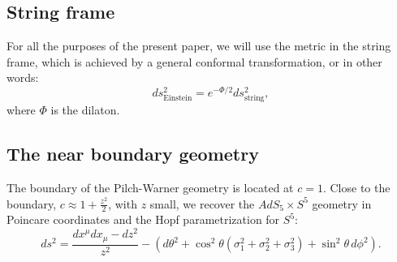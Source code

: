 \subsection{String frame}

For all the purposes of the present paper, we will use the metric in the string frame, which is achieved by a general conformal transformation, or in other words:
\begin{equation}
 ds^2_\text{Einstein} = e^{-\Phi / 2} ds^2_\text{string},
\end{equation}
where $\Phi$ is the dilaton.


\subsection{The near boundary geometry}

The boundary of the Pilch-Warner geometry is located at $c = 1$. 
Close to the boundary, $c \approx 1 + \frac{z^2}{2}$, with $z$ small, we recover the $AdS_5 \times S^5$ geometry in Poincare coordinates and the Hopf parametrization for $S^5$:
\begin{equation*}
ds^2=\dfrac{dx^{\mu } dx_{\mu}-dz^2}{z^2}-\left(d\theta^2+\cos^2\theta \left(\sigma_1^2+\sigma_2^2+\sigma_3^2\right)+\sin^2\theta \,d\phi^2 \right).
\end{equation*}

